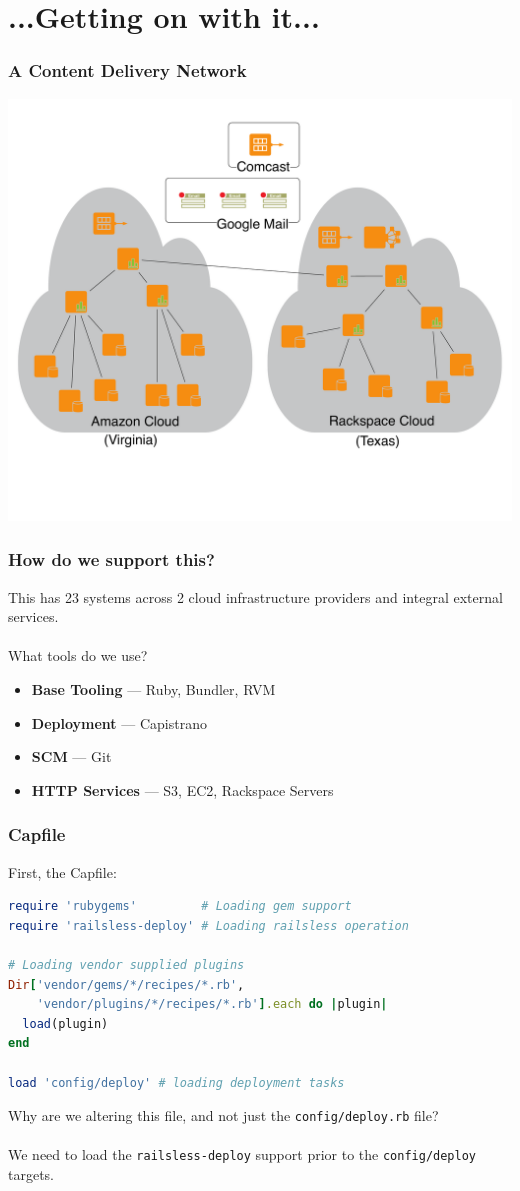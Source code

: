 \documentclass[t,handout]{beamer}
\begin{document}
\section{...Getting on with it...}
\begin{frame}
\frametitle{A Content Delivery Network}
\begin{center}
\includegraphics[width = 3.5 in]{hierarchical-clouds.pdf}
\end{center}
\end{frame}

\begin{frame}
\frametitle{How do we support this?}
This has 23 systems across 2 cloud infrastructure providers and integral external services.\\~\\

What tools do we use?
\begin{small}
\begin{itemize}
\item {\bf Base Tooling} --- Ruby, Bundler, RVM
\item {\bf Deployment} --- Capistrano
\item {\bf SCM} --- Git
\item {\bf HTTP Services} ---  S3, EC2, Rackspace Servers
\end{itemize}
\end{small}
\end{frame}

\begin{frame}[fragile]
\frametitle{Capfile}
First, the Capfile: \\
\begin{lstlisting}[frame=none,language=Ruby,basicstyle=\scriptsize\ttfamily\color{black},commentstyle=\scriptsize\ttfamily\color{red}]
require 'rubygems'         # Loading gem support
require 'railsless-deploy' # Loading railsless operation

# Loading vendor supplied plugins
Dir['vendor/gems/*/recipes/*.rb',
    'vendor/plugins/*/recipes/*.rb'].each do |plugin| 
  load(plugin) 
end

load 'config/deploy' # loading deployment tasks
\end{lstlisting}
Why are we altering this file, and not just the {\small\tt config/deploy.rb} file?\\~\\
We need to load the {\small\tt railsless-deploy} support prior to the {\small\tt config/deploy} targets.
\end{frame}
\end{document}
